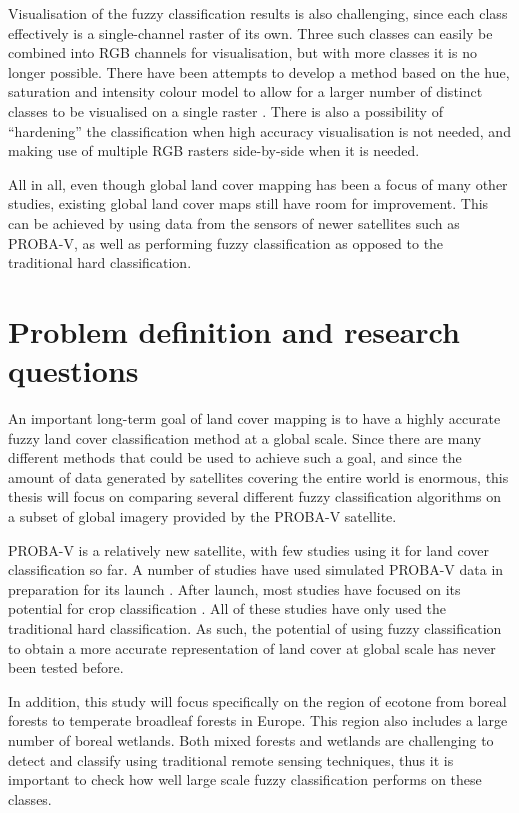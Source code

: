 \documentclass[a4paper,10pt]{book}
\begin{document}
Visualisation of the fuzzy classification results is also challenging, since each class effectively is a single-channel raster of its own. Three such classes can easily be combined into RGB channels for visualisation, but with more classes it is no longer possible. There have been attempts to develop a method based on the hue, saturation and intensity colour model to allow for a larger number of distinct classes to be visualised on a single raster \citep{hengl2004fuzzycmeans}. There is also a possibility of ``hardening'' the classification when high accuracy visualisation is not needed, and making use of multiple RGB rasters side-by-side when it is needed.

All in all, even though global land cover mapping has been a focus of many other studies, existing global land cover maps still have room for improvement. This can be achieved by using data from the sensors of newer satellites such as PROBA-V, as well as performing fuzzy classification as opposed to the traditional hard classification.

\section{Problem definition and research questions}

An important long-term goal of land cover mapping is to have a highly accurate fuzzy land cover classification method at a global scale. Since there are many different methods that could be used to achieve such a goal, and since the amount of data generated by satellites covering the entire world is enormous, this thesis will focus on comparing several different fuzzy classification algorithms on a subset of global imagery provided by the PROBA-V satellite.

PROBA-V is a relatively new satellite, with few studies using it for land cover classification so far. A number of studies have used simulated PROBA-V data in preparation for its launch \citep{stathakis2014probavurban,roumenina2013probavcrops,bartalev2014probavboreal}. After launch, most studies have focused on its potential for crop classification \citep{roumenina2015probavcrops,durgun2016crop,lambert2016cropland}. All of these studies have only used the traditional hard classification. As such, the potential of using fuzzy classification to obtain a more accurate representation of land cover at global scale has never been tested before.

In addition, this study will focus specifically on the region of ecotone from boreal forests to temperate broadleaf forests in Europe. This region also includes a large number of boreal wetlands. Both mixed forests and wetlands are challenging to detect and classify using traditional remote sensing techniques, thus it is important to check how well large scale fuzzy classification performs on these classes.
\end{document}
